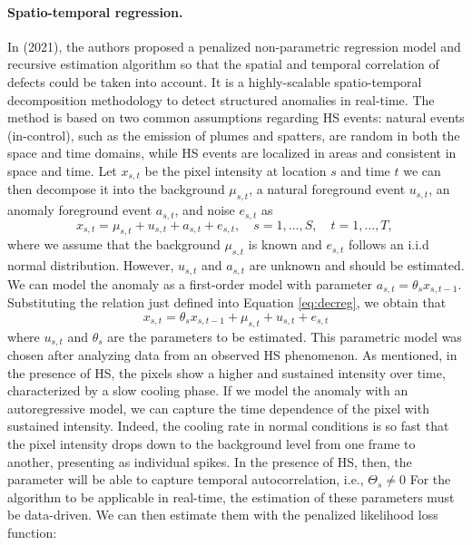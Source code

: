 \paragraph{Spatio-temporal regression.} In \citeauthor{yan_real-time_2021} (2021), the authors proposed a penalized non-parametric regression model and recursive estimation algorithm so that the spatial and temporal correlation of defects could be taken into account. It is a highly-scalable spatio-temporal decomposition methodology to detect structured anomalies in real-time. The method is based on two common assumptions regarding HS events: natural events (in-control), such as the emission of plumes and spatters, are random in both the space and time domains, while HS events are localized in areas and consistent in space and time. Let $x_{s,t}$ be the pixel intensity at location $s$ and time $t$ we can then decompose it into the background $\mu_{s, t}$, a natural foreground event $u_{s, t}$, an anomaly foreground event $a_{s, t}$, and noise $e_{s, t}$ as
\begin{equation}
\label{eq:decreg}
x_{s, t}=\mu_{s, t}+u_{s, t}+a_{s, t}+e_{s, t}, \quad s=1, \ldots, S, \quad t=1, \ldots, T \text {, }
\end{equation}
where we assume that the background $\mu_{s, t}$ is known and $e_{s, t}$ follows an i.i.d normal distribution. However, $u_{s, t}$ and $a_{s, t}$ are unknown and should be estimated. We can model the anomaly as a first-order model with parameter $a_{s,t}=\theta_sx_{s,t-1}$. Substituting the relation just defined into Equation \ref{eq:decreg}, we obtain that
\begin{equation}
x_{s, t}=\theta_s x_{s, t-1}+\mu_{s, t}+u_{s, t}+e_{s, t}
\end{equation}
where $u_{s, t}$ and  $\theta_s$ are the parameters to be estimated. 
This parametric model was chosen after analyzing data from an observed HS phenomenon. As mentioned, in the presence of HS, the pixels show a higher and sustained intensity over time, characterized by a slow cooling phase. If we model the anomaly with an autoregressive model, we can capture the time dependence of the pixel with sustained intensity. Indeed, the cooling rate in normal conditions is so fast that the pixel intensity drops down to the background level from one frame to another, presenting as individual spikes. In the presence of HS, then, the parameter will be able to capture temporal autocorrelation, i.e., $\Theta_s \neq 0$ 
For the algorithm to be applicable in real-time, the estimation of these parameters must be data-driven. We can then estimate them with the penalized likelihood loss function:
